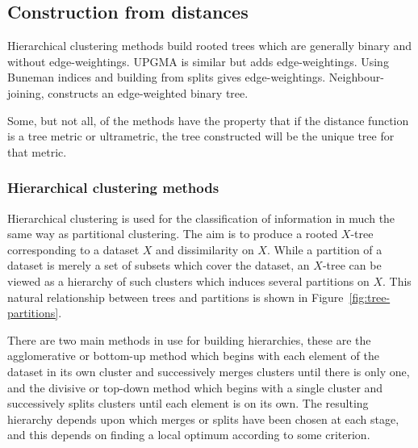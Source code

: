\subsection{Construction from distances}
\label{sec:constr-from-dist}

Hierarchical clustering methods build rooted trees which are generally binary
and without edge-weightings.  UPGMA is similar but adds edge-weightings.
Using Buneman indices and building from splits gives edge-weightings.
Neighbour-joining, constructs an edge-weighted binary tree.

Some, but not all, of the methods have the property that if the distance
function is a tree metric or ultrametric, the tree constructed will be the
unique tree for that metric.

\subsubsection{Hierarchical clustering methods}
\label{sec:hier-clust-meth}

Hierarchical clustering is used for the classification of information in much
the same way as partitional clustering.  The aim is to produce a rooted
$X$-tree corresponding to a dataset $X$ and dissimilarity on $X$.  While a
partition of a dataset is merely a set of subsets which cover the dataset, an
$X$-tree can be viewed as a hierarchy of such clusters which induces several
partitions on $X$.  This natural relationship between trees and partitions is
shown in Figure~\ref{fig:tree-partitions}.

There are two main methods in use for building hierarchies, these are the
agglomerative or bottom-up method which begins with each element of the
dataset in its own cluster and successively merges clusters until there is
only one, and the divisive or top-down method which begins with a single
cluster and successively splits clusters until each element is on its own.
The resulting hierarchy depends upon which merges or splits have been chosen
at each stage, and this depends on finding a local optimum according to some
criterion.

